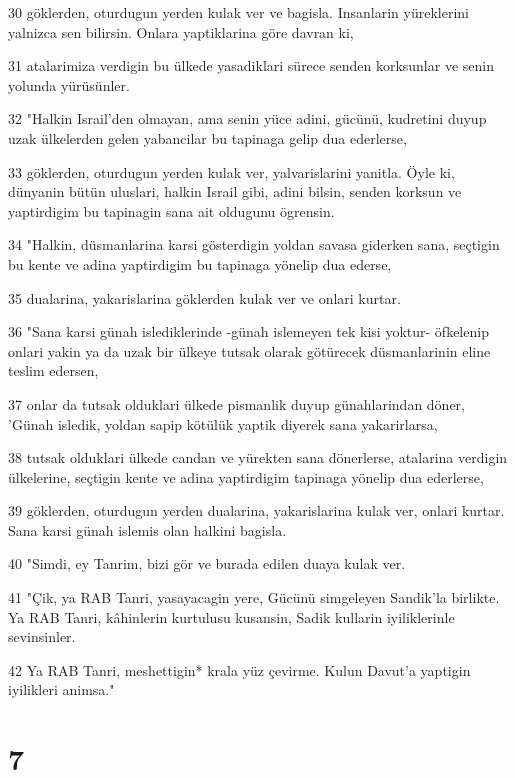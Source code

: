 \par 30 göklerden, oturdugun yerden kulak ver ve bagisla. Insanlarin yüreklerini yalnizca sen bilirsin. Onlara yaptiklarina göre davran ki,
\par 31 atalarimiza verdigin bu ülkede yasadiklari sürece senden korksunlar ve senin yolunda yürüsünler.
\par 32 "Halkin Israil'den olmayan, ama senin yüce adini, gücünü, kudretini duyup uzak ülkelerden gelen yabancilar bu tapinaga gelip dua ederlerse,
\par 33 göklerden, oturdugun yerden kulak ver, yalvarislarini yanitla. Öyle ki, dünyanin bütün uluslari, halkin Israil gibi, adini bilsin, senden korksun ve yaptirdigim bu tapinagin sana ait oldugunu ögrensin.
\par 34 "Halkin, düsmanlarina karsi gösterdigin yoldan savasa giderken sana, seçtigin bu kente ve adina yaptirdigim bu tapinaga yönelip dua ederse,
\par 35 dualarina, yakarislarina göklerden kulak ver ve onlari kurtar.
\par 36 "Sana karsi günah islediklerinde -günah islemeyen tek kisi yoktur- öfkelenip onlari yakin ya da uzak bir ülkeye tutsak olarak götürecek düsmanlarinin eline teslim edersen,
\par 37 onlar da tutsak olduklari ülkede pismanlik duyup günahlarindan döner, 'Günah isledik, yoldan sapip kötülük yaptik diyerek sana yakarirlarsa,
\par 38 tutsak olduklari ülkede candan ve yürekten sana dönerlerse, atalarina verdigin ülkelerine, seçtigin kente ve adina yaptirdigim tapinaga yönelip dua ederlerse,
\par 39 göklerden, oturdugun yerden dualarina, yakarislarina kulak ver, onlari kurtar. Sana karsi günah islemis olan halkini bagisla.
\par 40 "Simdi, ey Tanrim, bizi gör ve burada edilen duaya kulak ver.
\par 41 "Çik, ya RAB Tanri, yasayacagin yere, Gücünü simgeleyen Sandik'la birlikte. Ya RAB Tanri, kâhinlerin kurtulusu kusansin, Sadik kullarin iyiliklerinle sevinsinler.
\par 42 Ya RAB Tanri, meshettigin* krala yüz çevirme. Kulun Davut'a yaptigin iyilikleri animsa."

\chapter{7}

